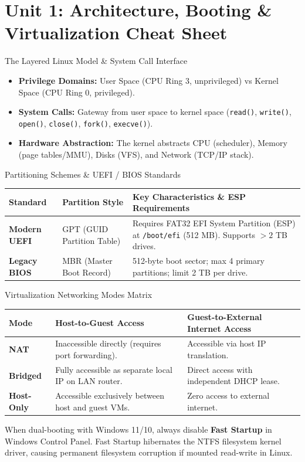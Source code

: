 \chapter{Unit 1: Architecture, Booting \& Virtualization Cheat Sheet}

\begin{cheatbox}{The Layered Linux Model \& System Call Interface}
\begin{itemize}[leftmargin=1.5em]
    \item \textbf{Privilege Domains:} User Space (CPU Ring 3, unprivileged) vs Kernel Space (CPU Ring 0, privileged).
    \item \textbf{System Calls:} Gateway from user space to kernel space (\texttt{read()}, \texttt{write()}, \texttt{open()}, \texttt{close()}, \texttt{fork()}, \texttt{execve()}).
    \item \textbf{Hardware Abstraction:} The kernel abstracts CPU (scheduler), Memory (page tables/MMU), Disks (VFS), and Network (TCP/IP stack).
\end{itemize}
\end{cheatbox}

\begin{syntaxbox}{Partitioning Schemes \& UEFI / BIOS Standards}
\begin{tabularx}{\linewidth}{l l X}
\toprule
\textbf{Standard} & \textbf{Partition Style} & \textbf{Key Characteristics \& ESP Requirements} \\
\midrule
\textbf{Modern UEFI} & GPT (GUID Partition Table) & Requires FAT32 EFI System Partition (ESP) at \texttt{/boot/efi} (512 MB). Supports $>2$ TB drives. \\
\textbf{Legacy BIOS} & MBR (Master Boot Record) & 512-byte boot sector; max 4 primary partitions; limit 2 TB per drive. \\
\bottomrule
\end{tabularx}
\end{syntaxbox}

\begin{syntaxbox}{Virtualization Networking Modes Matrix}
\begin{tabularx}{\linewidth}{l X X}
\toprule
\textbf{Mode} & \textbf{Host-to-Guest Access} & \textbf{Guest-to-External Internet Access} \\
\midrule
\textbf{NAT} & Inaccessible directly (requires port forwarding). & Accessible via host IP translation. \\
\textbf{Bridged} & Fully accessible as separate local IP on LAN router. & Direct access with independent DHCP lease. \\
\textbf{Host-Only} & Accessible exclusively between host and guest VMs. & Zero access to external internet. \\
\bottomrule
\end{tabularx}
\end{syntaxbox}

\begin{tipbox}
When dual-booting with Windows 11/10, always disable \textbf{Fast Startup} in Windows Control Panel. Fast Startup hibernates the NTFS filesystem kernel driver, causing permanent filesystem corruption if mounted read-write in Linux.
\end{tipbox}
